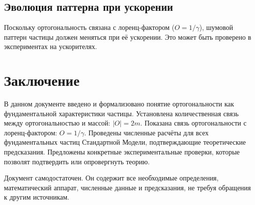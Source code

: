 \documentclass[12pt,a4paper]{article}
\begin{document}
\subsection{Эволюция паттерна при ускорении}
Поскольку ортогональность связана с лоренц-фактором ($O = 1/\gamma$), шумовой паттерн частицы должен меняться при её ускорении. Это может быть проверено в экспериментах на ускорителях.

\section{Заключение}
В данном документе введено и формализовано понятие ортогональности как фундаментальной характеристики частицы. Установлена количественная связь между ортогональностью и массой: $|O| = 2m$. Показана связь ортогональности с лоренц-фактором: $O = 1/\gamma$. Проведены численные расчёты для всех фундаментальных частиц Стандартной Модели, подтверждающие теоретические предсказания. Предложены конкретные экспериментальные проверки, которые позволят подтвердить или опровергнуть теорию.

Документ самодостаточен. Он содержит все необходимые определения, математический аппарат, численные данные и предсказания, не требуя обращения к другим источникам.
\end{document}
